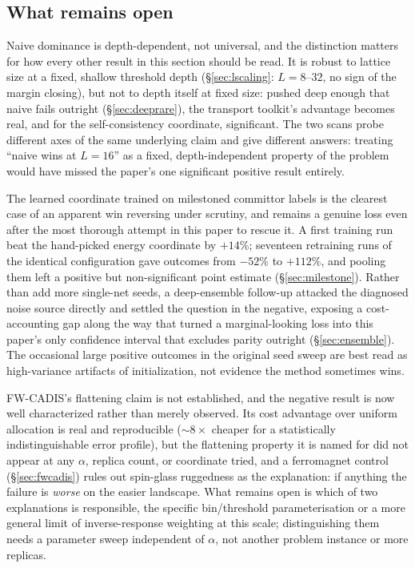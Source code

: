 \documentclass[a4paper,fleqn]{cas-sc}
\begin{document}
\subsection{What remains open}
Naive dominance is depth-dependent, not universal, and the distinction matters for
	how every other result in this section should be read. It is robust to lattice size at a
fixed, shallow threshold depth (\S\ref{sec:lscaling}: $L=8$--$32$, no sign of the margin
closing), but not to depth itself at fixed size: pushed deep enough that naive fails
outright (\S\ref{sec:deeprare}), the transport toolkit's advantage becomes real, and for the
self-consistency coordinate, significant. The two scans probe different axes of the same
underlying claim and give different answers: treating ``naive wins at $L=16$'' as a fixed,
depth-independent property of the problem would have missed the paper's one significant
positive result entirely.

The learned coordinate trained on milestoned committor labels is the clearest case
	of an apparent win reversing under scrutiny, and remains a genuine loss even after the
most thorough attempt in this paper to rescue it. A first training run beat the hand-picked
energy coordinate by $+14\%$; seventeen retraining runs of the identical configuration gave
outcomes from $-52\%$ to $+112\%$, and pooling them left a positive but non-significant
point estimate (\S\ref{sec:milestone}). Rather than add more single-net seeds, a
deep-ensemble follow-up attacked the diagnosed noise source directly and settled the
question in the negative, exposing a cost-accounting gap along the way that turned a
marginal-looking loss into this paper's only confidence interval that excludes parity
outright (\S\ref{sec:ensemble}). The occasional large positive outcomes in the original
seed sweep are best read as high-variance artifacts of initialization, not evidence the
method sometimes wins.

FW-CADIS's flattening claim is not established, and the negative result is now
	well characterized rather than merely observed. Its cost advantage over uniform
allocation is real and reproducible ($\sim\!8\times$ cheaper for a statistically
indistinguishable error profile), but the flattening property it is named for did not
appear at any $\alpha$, replica count, or coordinate tried, and a ferromagnet control
(\S\ref{sec:fwcadis}) rules out spin-glass ruggedness as the explanation: if anything the
failure is \emph{worse} on the easier landscape. What remains open is which of two
explanations is responsible, the specific bin/threshold parameterisation or a more general
limit of inverse-response weighting at this scale; distinguishing them needs a parameter
sweep independent of $\alpha$, not another problem instance or more replicas.
\end{document}
